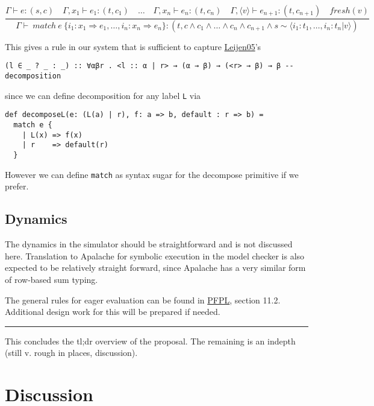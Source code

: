 \documentclass[11pt]{article}
\begin{document}
$$
\frac{
\Gamma \vdash e : (s, c) \quad
\Gamma, x_1 \vdash e_1 : (t, c_1) \quad \ldots \quad \Gamma, x_n \vdash e_n : (t, c_n) \quad
\Gamma, \langle v \rangle \vdash e_{n+1} : (t, c_{n+1}) \quad
fresh(v)
}{
\Gamma \vdash \ match \ e \ \{ i_1 : x_1 \Rightarrow e_1, \ldots, i_n : x_n \Rightarrow e_n \} : (t,
c \land c_1 \land \ldots \land c_n \land c_{n+1} \land
s \sim \langle i_1 : t_1, \ldots, i_n : t_n | v \rangle)
}
$$


This gives a rule in our system that is sufficient to capture \href{https://www.microsoft.com/en-us/research/publication/extensible-records-with-scoped-labels/}{Leijen05}'s

\begin{verbatim}
(l ∈ _ ? _ : _) :: ∀αβr . <l :: α | r> → (α → β) → (<r> → β) → β -- decomposition
\end{verbatim}

since we can define decomposition for any label \texttt{L} via

\begin{verbatim}
def decomposeL(e: (L(a) | r), f: a => b, default : r => b) = 
  match e { 
    | L(x) => f(x) 
    | r    => default(r) 
  }
\end{verbatim}

However we can define \texttt{match} as syntax sugar for the decompose
primitive if we prefer.

\subsection{Dynamics}
\label{sec:orgb0ef3a2}
The dynamics in the simulator should be straightforward and is not
discussed here. Translation to Apalache for symbolic execution in the
model checker is also expected to be relatively straight forward, since
Apalache has a very similar form of row-based sum typing.

The general rules for eager evaluation can be found in
\href{https://www.cs.cmu.edu/\~rwh/pfpl.html}{PFPL}, section 11.2.
Additional design work for this will be prepared if needed.

\noindent\rule{\textwidth}{0.5pt}

This concludes the tl;dr overview of the proposal. The remaining is an
indepth (still v. rough in places, discussion).

\section{Discussion}
\label{sec:org3b0e6b8}
\end{document}
